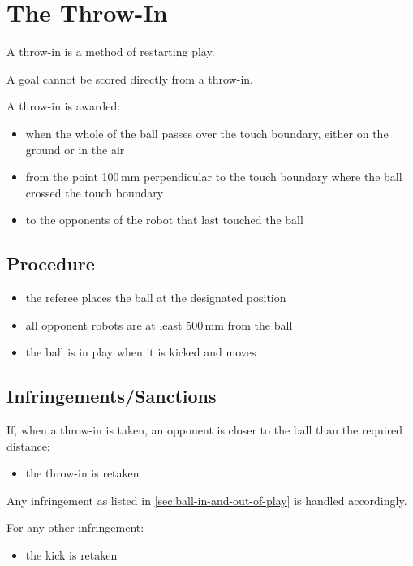 \section{The Throw-In}\label{sec:throw-in}

A throw-in is a method of restarting play.

A goal cannot be scored directly from a throw-in.

A throw-in is awarded:

\begin{itemize}
\item when the whole of the ball passes over the touch boundary, either on the ground or in the air
\item from the point 100\,mm perpendicular to the touch boundary where the ball crossed the touch boundary
\item to the opponents of the robot that last touched the ball
\end{itemize}

\subsection{Procedure}
\begin{itemize}
\item the referee places the ball at the designated position
\item all opponent robots are at least 500\,mm from the ball
\item the ball is in play when it is kicked and moves
\end{itemize}

\subsection{Infringements/Sanctions}
If, when a throw-in is taken, an opponent is closer to the ball than the required distance:

\begin{itemize}
\item the throw-in is retaken
\end{itemize}

Any infringement as listed in \autoref{sec:ball-in-and-out-of-play} is handled accordingly.

For any other infringement:

\begin{itemize}
\item the kick is retaken
\end{itemize}
